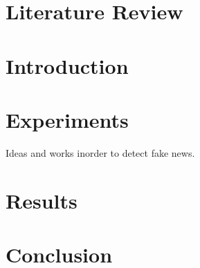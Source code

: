 \section{Literature Review}
\section{Introduction}
\section{Experiments}
Ideas and works inorder to detect fake news.
\section{Results}
\section{Conclusion}
